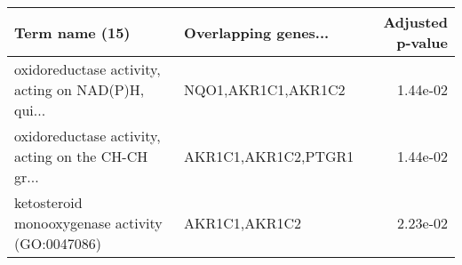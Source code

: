 \begin{tabular}{llr}
\toprule
                                    Term name (15) & Overlapping genes... &  Adjusted p-value \\
\midrule
oxidoreductase activity, acting on NAD(P)H, qui... &   NQO1,AKR1C1,AKR1C2 &          1.44e-02 \\
oxidoreductase activity, acting on the CH-CH gr... &  AKR1C1,AKR1C2,PTGR1 &          1.44e-02 \\
   ketosteroid monooxygenase activity (GO:0047086) &        AKR1C1,AKR1C2 &          2.23e-02 \\
\bottomrule
\end{tabular}
